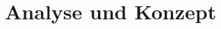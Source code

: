 
\section{Analyse und Konzept} \label{sec:03-concept}

\begin{comment}
Im folgenden Kapitel werden verschiedene Techniken zur kontinuierlichen Integrierung von Code analysiert und eine
Konzeption für Shopware-basierte Projekte erarbeitet.

Um Kundenprojekte mit Shopware umsetzen zu können, muss zunächst definiert sein, welche Bereiche der Plattform
anpassbar sind und wie diese Anpassungen zustande kommen.
Da das Shop-Backend und Frontend für Kunden erweiterbar sein soll, werden sogenannte \glqq Plugins\grqq\ verwendet.
Bei Plugins handelt es sich um Erweiterungen in Form von Code, welche einer durch die Plattform vorgegeben Ordner-
und Datei-Struktur folgt.
Hierbei können sowohl die für verschiedene Backend-Bereiche zuständigen PHP-Dateien als auch die für das Back- und
Frontend verwendeten Templates, JavaScript-Logik und Style-Dateien erweitert werden.
Für die Analyse der kontinuierlichen Integrierung der Kundenprojekte wird sich somit im folgenden auf die von Shopware
vorgegebenen Erweiterungsmöglichkeiten bezogen.
\end{comment}

\clearpage
